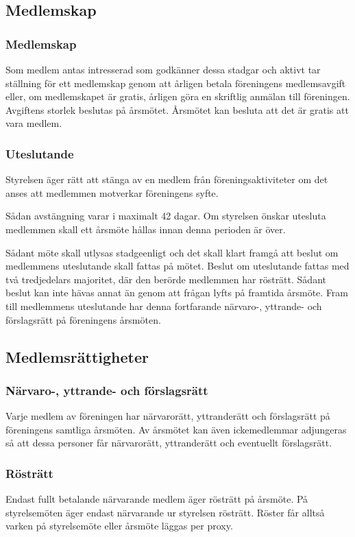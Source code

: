 \subsection{Medlemskap}

\subsubsection{Medlemskap}
Som medlem antas intresserad som godkänner dessa stadgar och aktivt tar ställning för ett medlemskap genom att årligen betala föreningens medlemsavgift eller, om medlemskapet är gratis, årligen göra en skriftlig anmälan till föreningen. Avgiftens storlek beslutas på årsmötet. Årsmötet kan besluta att det är gratis att vara medlem.

\subsubsection{Uteslutande}
Styrelsen äger rätt att stänga av en medlem från föreningsaktiviteter om det anses att medlemmen motverkar föreningens syfte.

Sådan avstängning varar i maximalt 42 dagar. Om styrelsen önskar utesluta medlemmen skall ett årsmöte hållas innan denna perioden är över.

Sådant möte skall utlysas stadgeenligt och det skall klart framgå att beslut om medlemmens uteslutande skall fattas på mötet. Beslut om uteslutande fattas med två tredjedelars majoritet, där den berörde medlemmen har rösträtt. Sådant beslut kan inte hävas annat än genom att frågan lyfts på framtida årsmöte. Fram till medlemmens uteslutande har denna fortfarande närvaro-, yttrande- och förslagsrätt på föreningens årsmöten.




\subsection{Medlemsrättigheter}

\subsubsection{Närvaro-, yttrande- och förslagsrätt}
Varje medlem av föreningen har närvarorätt, yttranderätt och förslagsrätt på föreningens samtliga årsmöten. Av årsmötet kan även ickemedlemmar adjungeras så att dessa personer får närvarorätt, yttranderätt och eventuellt förslagsrätt.

\subsubsection{Rösträtt}
Endast fullt betalande närvarande medlem äger rösträtt på årsmöte. På styrelsemöten äger endast närvarande ur styrelsen rösträtt. Röster får alltså varken på styrelsemöte eller årsmöte läggas per proxy.